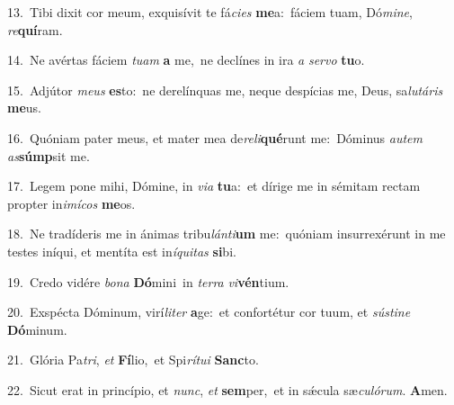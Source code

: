 {\numbfont\textcolor{\numbcolor}{13.}}~Tibi dixit cor meum, exquisívit te fá\-\textit{ci}\-\textit{es} \textbf{me}\-a:~\star fáciem tuam, Dó\-\textit{mi}\-\textit{ne}, \textit{re}\-\textbf{quí}ram.\par
{\numbfont\textcolor{\numbcolor}{14.}}~Ne avértas fáciem \textit{tu}\-\textit{am} \textbf{a} me,~\star ne declínes in ira \textit{a} \textit{ser}\-\textit{vo} \textbf{tu}\-o.\par
{\numbfont\textcolor{\numbcolor}{15.}}~Adjútor \textit{me}\-\textit{us} \textbf{es}\-to:~\star ne derelínquas me, neque despícias me, Deus, sa\-\textit{lu}\-\textit{tá}\textit{ris} \textbf{me}\-us.\par
{\numbfont\textcolor{\numbcolor}{16.}}~Quóniam pater meus, et mater mea de\-\textit{re}\-\textit{li}\textbf{qué}runt me:~\star Dóminus \textit{au}\-\textit{tem} \textit{as}\-\textbf{súmp}sit me.\par
{\numbfont\textcolor{\numbcolor}{17.}}~Legem pone mihi, Dómine, in \textit{vi}\-\textit{a} \textbf{tu}\-a:~\star et dírige me in sémitam rectam propter in\-\textit{i}\-\textit{mí}\textit{cos} \textbf{me}\-os.\par
{\numbfont\textcolor{\numbcolor}{18.}}~Ne tradíderis me in ánimas tribu\-\textit{lán}\-\textit{ti}\textbf{um} me:~\star quóniam insurrexérunt in me testes iníqui, et mentíta est in\-\textit{í}\-\textit{qui}\textit{tas} \textbf{si}\-bi.\par
{\numbfont\textcolor{\numbcolor}{19.}}~Credo vidére \textit{bo}\-\textit{na} \textbf{Dó}\-mini~\star in \textit{ter}\-\textit{ra} \textit{vi}\-\textbf{vén}tium.\par
{\numbfont\textcolor{\numbcolor}{20.}}~Exspécta Dóminum, virí\-\textit{li}\-\textit{ter} \textbf{a}\-ge:~\star et confortétur cor tuum, et \textit{sús}\-\textit{ti}\textit{ne} \textbf{Dó}\-minum.\par
{\numbfont\textcolor{\numbcolor}{21.}}~Glória Pa\-\textit{tri}\-, \textit{et} \textbf{Fí}\-lio,~\star et Spi\-\textit{rí}\-\textit{tu}\textit{i} \textbf{Sanc}\-to.\par
{\numbfont\textcolor{\numbcolor}{22.}}~Sicut erat in princípio, et \textit{nunc}\-, \textit{et} \textbf{sem}\-per,~\star et in sǽcula sæ\-\textit{cu}\-\textit{ló}\textit{rum}. \textbf{A}\-men.\par

